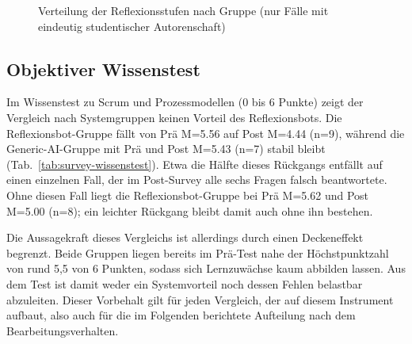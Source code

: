 \begin{figure}[htb]
\centering
{}
\caption{Verteilung der Reflexionsstufen nach Gruppe (nur Fälle mit eindeutig studentischer
Autorenschaft)}
\label{fig:ergebnisse-stufen}
\end{figure}

\subsection*{Objektiver Wissenstest}
Im Wissenstest zu Scrum und Prozessmodellen (0 bis 6 Punkte) zeigt der Vergleich nach Systemgruppen
keinen Vorteil des Reflexionsbots. Die Reflexionsbot-Gruppe fällt von Prä M=5.56 auf Post M=4.44
(n=9), während die Generic-AI-Gruppe mit Prä und Post M=5.43 (n=7) stabil bleibt
(Tab.~\ref{tab:survey-wissenstest}). Etwa die Hälfte dieses Rückgangs entfällt auf einen einzelnen
Fall, der im Post-Survey alle sechs Fragen falsch beantwortete. Ohne diesen Fall liegt die
Reflexionsbot-Gruppe bei Prä M=5.62 und Post M=5.00 (n=8); ein leichter Rückgang bleibt damit auch
ohne ihn bestehen.

Die Aussagekraft dieses Vergleichs ist allerdings durch einen Deckeneffekt begrenzt. Beide Gruppen
liegen bereits im Prä-Test nahe der Höchstpunktzahl von rund 5,5 von 6 Punkten, sodass sich
Lernzuwächse kaum abbilden lassen. Aus dem Test ist damit weder ein Systemvorteil noch dessen Fehlen
belastbar abzuleiten. Dieser Vorbehalt gilt für jeden Vergleich, der auf diesem Instrument aufbaut,
also auch für die im Folgenden berichtete Aufteilung nach dem Bearbeitungsverhalten.

